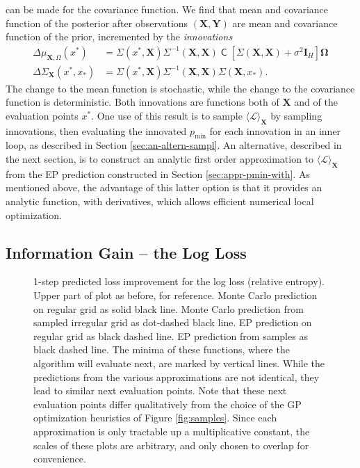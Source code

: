 \documentclass[twoside,11pt]{article}
\renewcommand{\L}{\mathcal{L}}
\newcommand{\vY}{\vec{Y}}
\newcommand{\vX}{\vec{X}}
\newcommand{\pmin}{p_{\min}}
\renewcommand{\vec}{\boldsymbol}
\newcommand{\Id}{\vec{I}}
\newcommand{\chol}{\operatorname{\mathsf{C}}}
\newcommand{\inputTikZ}[1]{%
 }
\newcommand{\inputTikZ}[1]{%
   \beginpgfgraphicnamed{#1-external}%
   \endpgfgraphicnamed%
 }
\begin{document}
can be made for the covariance function. We find that mean and
covariance function of the posterior after observations $(\vX,\vY)$
are mean and covariance function of the prior, incremented by the
\emph{innovations}
\begin{equation}
  \label{eq:19}
  \begin{aligned}
    \Delta\mu_{\vX,\Omega}(x^*) &= \Sigma(x^*,\vX)
    \Sigma^{-1}(\vX,\vX)
    \chol[\Sigma(\vX,\vX)+\sigma^2\Id_H] \vec{\Omega} \\
    \Delta\Sigma_{\vX}(x^*,x_*) &= \Sigma(x^*,\vX)
    \Sigma^{-1}(\vX,\vX) \Sigma(\vX,x_*).
  \end{aligned}
\end{equation}
The change to the mean function is stochastic, while the change to the
covariance function is deterministic. Both innovations are functions
both of $\vX$ and of the evaluation points $x^*$. One use of this
result is to sample $\langle \L\rangle_{\vX}$ by sampling innovations,
then evaluating the innovated $\pmin$ for each innovation in an inner
loop, as described in Section \ref{sec:an-altern-sampl}. An
alternative, described in the next section, is to construct an
analytic first order approximation to $\langle \L\rangle_{\vX}$ from
the EP prediction constructed in Section \ref{sec:appr-pmin-with}. As
mentioned above, the advantage of this latter option is that it
provides an analytic function, with derivatives, which allows
efficient numerical local optimization.

\subsection{Information Gain -- the Log Loss}
\label{sec:information-gain-log}

\begin{figure}
  \centering
  \inputTikZ{figures/LogLoss}
  \caption{1-step predicted loss improvement for the log loss
    (relative entropy). Upper part of plot as before, for
    reference. Monte Carlo prediction on regular grid as solid black
    line. Monte Carlo prediction from sampled irregular grid as
    dot-dashed black line. EP prediction on regular grid as black
    dashed line. EP prediction from samples as black dashed line. The
    minima of these functions, where the algorithm will evaluate next,
    are marked by vertical lines. While the predictions from the
    various approximations are not identical, they lead to similar
    next evaluation points. Note that these next evaluation points
    differ qualitatively from the choice of the GP optimization
    heuristics of Figure \ref{fig:samples}. Since each approximation
    is only tractable up a multiplicative constant, the scales of
    these plots are arbitrary, and only chosen to overlap for
    convenience.}
  \label{fig:logloss}
\end{figure}
\end{document}
